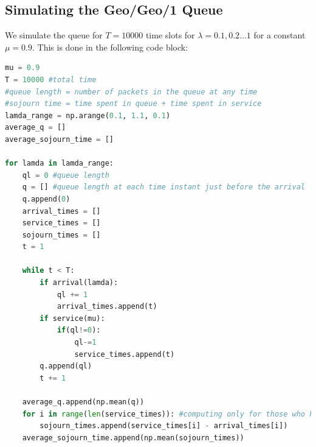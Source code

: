 \documentclass[11pt, a4paper]{article}
\begin{document}
\subsection{Simulating the Geo/Geo/1 Queue}
We simulate the queue for $T=10000$ time slots for $\lambda=0.1,0.2 \ldots 1$ for a constant $\mu = 0.9$. This is done in the following code block:
\\
\begin{lstlisting}[language = Python]
mu = 0.9
T = 10000 #total time
#queue length = number of packets in the queue at any time
#sojourn time = time spent in queue + time spent in service
lamda_range = np.arange(0.1, 1.1, 0.1)
average_q = []
average_sojourn_time = []

for lamda in lamda_range:
    ql = 0 #queue length
    q = [] #queue length at each time instant just before the arrival
    q.append(0)
    arrival_times = []
    service_times = []
    sojourn_times = []
    t = 1

    while t < T:
        if arrival(lamda):
            ql += 1
            arrival_times.append(t)
        if service(mu):
            if(ql!=0):
                ql-=1
                service_times.append(t)
        q.append(ql)
        t += 1

    average_q.append(np.mean(q))
    for i in range(len(service_times)): #computing only for those who have been served
        sojourn_times.append(service_times[i] - arrival_times[i])
    average_sojourn_time.append(np.mean(sojourn_times))

\end{lstlisting}
\end{document}
